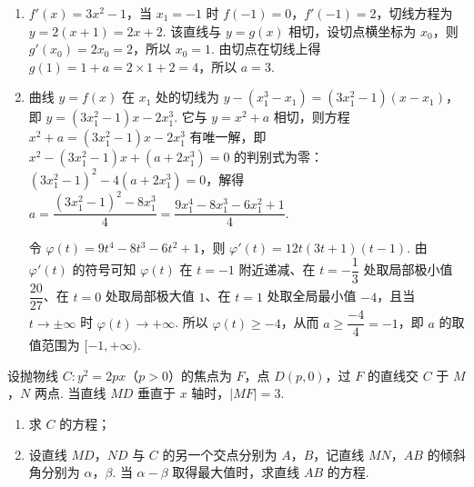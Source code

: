 \begin{solution}
\begin{enumerate}
\item \(f'(x)=3x^2-1\)，当 \(x_1=-1\) 时 \(f(-1)=0\)，\(f'(-1)=2\)，切线方程为 \(y=2(x+1)=2x+2\). 该直线与 \(y=g(x)\) 相切，设切点横坐标为 \(x_0\)，则 \(g'(x_0)=2x_0=2\)，所以 \(x_0=1\). 由切点在切线上得 \(g(1)=1+a=2\times1+2=4\)，所以 \(a=3\).

\item 曲线 \(y=f(x)\) 在 \(x_1\) 处的切线为 \(y-(x_1^3-x_1)=(3x_1^2-1)(x-x_1)\)，即 \(y=(3x_1^2-1)x-2x_1^3\). 它与 \(y=x^2+a\) 相切，则方程 \(x^2+a=(3x_1^2-1)x-2x_1^3\) 有唯一解，即 \(x^2-(3x_1^2-1)x+(a+2x_1^3)=0\) 的判别式为零：\((3x_1^2-1)^2-4(a+2x_1^3)=0\)，解得 \(a=\dfrac{(3x_1^2-1)^2-8x_1^3}4=\dfrac{9x_1^4-8x_1^3-6x_1^2+1}4\).

令 \(\varphi(t)=9t^4-8t^3-6t^2+1\)，则 \(\varphi'(t)=12t(3t+1)(t-1)\). 由 \(\varphi'(t)\) 的符号可知 \(\varphi(t)\) 在 \(t=-1\) 附近递减、在 \(t=-\dfrac13\) 处取局部极小值 \(\dfrac{20}{27}\)、在 \(t=0\) 处取局部极大值 \(1\)、在 \(t=1\) 处取全局最小值 \(-4\)，且当 \(t\to\pm\infty\) 时 \(\varphi(t)\to+\infty\). 所以 \(\varphi(t)\ge-4\)，从而 \(a\ge\dfrac{-4}4=-1\)，即 \(a\) 的取值范围为 \([-1,+\infty)\).
\end{enumerate}
\end{solution}

\begin{problem}
设抛物线 \(C:y^2=2px\)（\(p>0\)）的焦点为 \(F\)，点 \(D\left(p,0\right)\)，过 \(F\) 的直线交 \(C\) 于 \(M\)，\(N\) 两点. 当直线 \(MD\) 垂直于 \(x\) 轴时，\(\lvert MF\rvert=3\).

\begin{enumerate}
\item 求 \(C\) 的方程；
\item 设直线 \(MD\)，\(ND\) 与 \(C\) 的另一个交点分别为 \(A\)，\(B\)，记直线 \(MN\)，\(AB\) 的倾斜角分别为 \(\alpha\)，\(\beta\). 当 \(\alpha-\beta\) 取得最大值时，求直线 \(AB\) 的方程.
\end{enumerate}
\end{problem}

